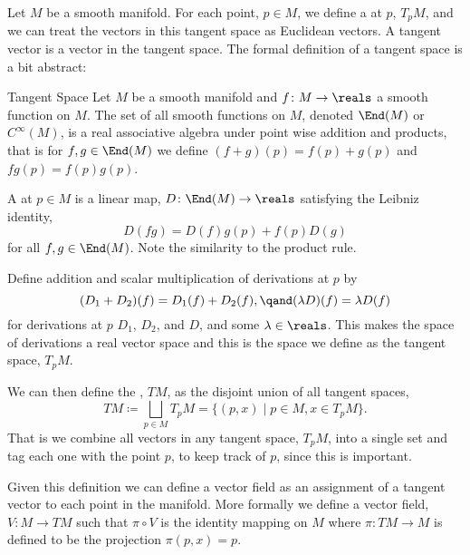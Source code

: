 Let \(M\) be a smooth manifold.
For each point, \(p \in M\), we define a  at \(p\), \(T_pM\), and we can treat the vectors in this tangent space as Euclidean vectors.
A tangent vector is a vector in the tangent space.
The formal definition of a tangent space is a bit abstract:
\begin{dfn}{Tangent Space}{}
    Let \(M\) be a smooth manifold and \(f \colon M \to \reals\) a smooth function on \(M\).
    The set of all smooth functions on \(M\), denoted \(\End(M)\) or \(C^{\infty}(M)\), is a real associative algebra under point wise addition and products, that is for \(f, g \in \End(M)\) we define \((f + g)(p) = f(p) + g(p)\) and \(fg(p) = f(p)g(p)\).
    
    A  at \(p \in M\) is a linear map, \(D \colon \End(M) \to \reals\) satisfying the Leibniz identity,
    \begin{equation}
        D(fg) = D(f)g(p) + f(p)D(g)
    \end{equation}
    for all \(f, g \in \End(M)\).
    Note the similarity to the product rule.
    
    Define addition and scalar multiplication of derivations at \(p\) by
    \begin{equation}
        (D_1 + D_2)(f) = D_1(f) + D_2(f), \qand (\lambda D)(f) = \lambda D(f)
    \end{equation}
    for derivations at \(p\) \(D_1\), \(D_2\), and \(D\), and some \(\lambda \in \reals\).
    This makes the space of derivations a real vector space and this is the space we define as the tangent space, \(T_pM\).
    
    We can then define the , \(TM\), as the disjoint union of all tangent spaces,
    \begin{equation}
        TM \coloneqq \bigsqcup_{p \in M} T_pM = \{(p, x) \mid p \in M, x \in T_pM\}.
    \end{equation}
    That is we combine all vectors in any tangent space, \(T_pM\), into a single set and tag each one with the point \(p\), to keep track of \(p\), since this is important.
\end{dfn}

Given this definition we can define a vector field as an assignment of a tangent vector to each point in the manifold.
More formally we define a vector field, \(V \colon M \to TM\) such that \(\pi \circ V\) is the identity mapping on \(M\) where \(\pi \colon TM \to M\) is defined to be the projection \(\pi(p, x) = p\).
